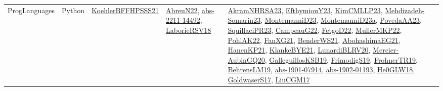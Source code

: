 {\begin{longtable}{lp{3cm}>{\raggedright}p{6cm}>{\raggedright}p{6cm}p{8cm}}
ProgLanguages & Python & \href{articles/KoehlerBFFHPSSS21.pdf}{KoehlerBFFHPSSS21}\cite{KoehlerBFFHPSSS21} & \href{articles/AbreuN22.pdf}{AbreuN22}\cite{AbreuN22}, \href{articles/abs-2211-14492.pdf}{abs-2211-14492}\cite{abs-2211-14492}, \href{articles/LaborieRSV18.pdf}{LaborieRSV18}\cite{LaborieRSV18} & \href{articles/AkramNHRSA23.pdf}{AkramNHRSA23}\cite{AkramNHRSA23}, \href{papers/EfthymiouY23.pdf}{EfthymiouY23}\cite{EfthymiouY23}, \href{papers/KimCMLLP23.pdf}{KimCMLLP23}\cite{KimCMLLP23}, \href{papers/Mehdizadeh-Somarin23.pdf}{Mehdizadeh-Somarin23}\cite{Mehdizadeh-Somarin23}, \href{articles/MontemanniD23.pdf}{MontemanniD23}\cite{MontemanniD23}, \href{articles/MontemanniD23a.pdf}{MontemanniD23a}\cite{MontemanniD23a}, \href{papers/PovedaAA23.pdf}{PovedaAA23}\cite{PovedaAA23}, \href{papers/SquillaciPR23.pdf}{SquillaciPR23}\cite{SquillaciPR23}, \href{articles/CampeauG22.pdf}{CampeauG22}\cite{CampeauG22}, \href{articles/FetgoD22.pdf}{FetgoD22}\cite{FetgoD22}, \href{articles/MullerMKP22.pdf}{MullerMKP22}\cite{MullerMKP22}, \href{articles/PohlAK22.pdf}{PohlAK22}\cite{PohlAK22}, \href{articles/FanXG21.pdf}{FanXG21}\cite{FanXG21}, \href{papers/BenderWS21.pdf}{BenderWS21}\cite{BenderWS21}, \href{articles/AbohashimaEG21.pdf}{AbohashimaEG21}\cite{AbohashimaEG21}, \href{papers/HanenKP21.pdf}{HanenKP21}\cite{HanenKP21}, \href{papers/KlankeBYE21.pdf}{KlankeBYE21}\cite{KlankeBYE21}, \href{articles/LunardiBLRV20.pdf}{LunardiBLRV20}\cite{LunardiBLRV20}, \href{papers/Mercier-AubinGQ20.pdf}{Mercier-AubinGQ20}\cite{Mercier-AubinGQ20}, \href{papers/GalleguillosKSB19.pdf}{GalleguillosKSB19}\cite{GalleguillosKSB19}, \href{papers/FrimodigS19.pdf}{FrimodigS19}\cite{FrimodigS19}, \href{papers/FrohnerTR19.pdf}{FrohnerTR19}\cite{FrohnerTR19}, \href{papers/BehrensLM19.pdf}{BehrensLM19}\cite{BehrensLM19}, \href{articles/abs-1901-07914.pdf}{abs-1901-07914}\cite{abs-1901-07914}, \href{articles/abs-1902-01193.pdf}{abs-1902-01193}\cite{abs-1902-01193}, \href{papers/He0GLW18.pdf}{He0GLW18}\cite{He0GLW18}, \href{papers/GoldwaserS17.pdf}{GoldwaserS17}\cite{GoldwaserS17}, \href{papers/LiuCGM17.pdf}{LiuCGM17}\cite{LiuCGM17}\\

\end{longtable}}
